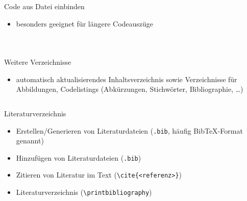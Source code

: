 \documentclass[presentation,aspectratio=169]{beamer}
\begin{document}
\begin{frame}[fragile]{Code aus Datei einbinden}
  \begin{itemize}
    \item besonders geeignet für längere Codeauszüge
  \end{itemize}
  \begin{columns}
    \begin{column}{.4\textwidth}
      
    \end{column}
    \begin{column}{.5\textwidth}
      \inputminted{latex}{codebeispiele/listings-from-file.tex}
    \end{column}
  \end{columns}
\end{frame}

\begin{frame}[fragile]{Weitere Verzeichnisse}
  \begin{itemize}
    \item automatisch aktualisierendes Inhaltsverzeichnis sowie Verzeichnisse für Abbildungen, Codelistings (Abkürzungen, Stichwörter, Bibliographie, \dots)
  \end{itemize}
  \inputminted{latex}{codebeispiele/list-of-everything.tex}
\end{frame}

\begin{frame}[fragile]{Literaturverzeichnis}
  \begin{itemize}
    \item Erstellen/Generieren von Literaturdateien (\verb|.bib|, häufig Bib\TeX{}-Format genannt)
    \item Hinzufügen von Literaturdateien (\verb|.bib|)
    \item Zitieren von Literatur im Text (\verb|\cite{<referenz>}|)
    \item Literaturverzeichnis (\verb|\printbibliography|)
  \end{itemize}
\end{frame}
\end{document}

